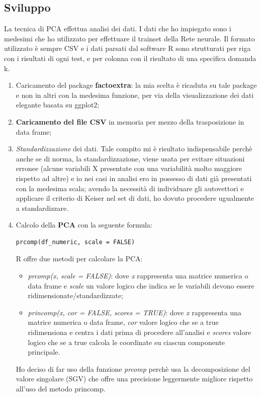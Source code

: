 \subsection{Sviluppo}
\label{Sviluppo}
La tecnica di PCA effettua analisi dei dati. I dati che ho impiegato sono i medesimi che ho utilizzato per effettuare il trainset della Rete neurale. Il formato utilizzato \`e sempre CSV e i dati parsati dal software R sono strutturati per riga con  i risultati di ogni test, e per colonna con il risultato di una specifica domanda k.
\begin{enumerate}
\item Caricamento del package \textbf{factoextra}: la mia scelta \`e ricaduta su tale package e non in altri con la medesima funzione, per via della visualizzazione dei dati elegante basata su ggplot2;
\item \textbf{Caricamento del file CSV} in memoria per mezzo della trasposizione in data frame;
\item \textit{Standardizzazione} dei dati. Tale compito mi \`e risultato indispensabile  perch\`e anche se di norma, la standardizzazione, viene usata per evitare situazioni erronee (alcune variabili X presentate con una variabilit\`a molto maggiore rispetto ad altre) e io nei casi in analisi ero in possesso di dati gi\`a presentati con la medesima scala;  avendo la necessit\`a di individuare gli autovettori e applicare il criterio di Keiser nel set di dati, ho dovuto procedere ugualmente a standardizzare.
\item Calcolo della \textbf{PCA} con la seguente formula:
\begin{verbatim}
prcomp(df_numeric, scale = FALSE) 
\end{verbatim}
R offre due metodi per calcolare la PCA: 
\begin{itemize}
\item \textit{prcomp(x, scale = FALSE)}: dove \textit{x} rappresenta una matrice numerica o data frame e \textit{scale} un valore logico che indica se le variabili devono essere ridimensionate/standardizzate;
\item \textit{princomp(x, cor = FALSE, scores = TRUE)}: dove \textit{x} rappresenta una matrice numerica o data frame, \textit{cor} valore logico che se a true ridimensiona e centra i dati prima di procedere all'analisi e \textit{scores} valore logico che se a true calcola le coordinate su ciascun componente principale.\\
\end{itemize}
\noindent
Ho deciso di far uso della funzione \textit{prcomp} perch\`e usa la decomposizione del valore singolare (SGV) che offre una precisione leggermente migliore rispetto all'uso del metodo princomp.

\end{enumerate}
